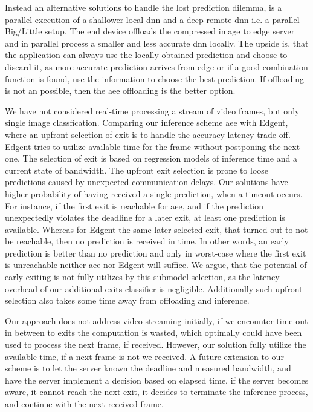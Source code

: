 Instead an alternative solutions to handle the lost prediction dilemma, is a parallel execution of a shallower local \gls{dnn} and a deep remote \gls{dnn} i.e. a parallel Big/Little setup. The end device offloads the compressed image to edge server and in parallel process a smaller and less accurate \gls{dnn} locally. The upside is, that the application can always use the locally obtained prediction and choose to discard it, as more accurate prediction arrives from edge or if a good combination function is found, use the information to choose the best prediction. If offloading is not an possible, then the \gls{aee} offloading is the better option.

We have not considered real-time processing a stream of video frames, but only single image classfication. Comparing our inference scheme \gls{aee} with Edgent, where an upfront selection of exit is to handle the accuracy-latency trade-off. Edgent tries to utilize available time for the frame without postponing the next one. The selection of exit is based on regression models of inference time and a current state of bandwidth. The upfront exit selection is prone to loose predictions caused by unexpected communication delays. Our solutions have higher probability of having received a single prediction, when a timeout occurs. For instance, if the first exit is reachable for \gls{aee}, and if the prediction unexpectedly violates the deadline for a later exit, at least one prediction is available. Whereas for Edgent the same later selected exit, that turned out to not be reachable, then no prediction is received in time. In other words, an early prediction is better than no prediction and only in worst-case where the first exit is unreachable neither \gls{aee} nor Edgent will suffice. We argue, that the potential of early exiting is not fully utilizes by this submodel selection, as the latency overhead of our additional exits classifier is negligible. Additionally such upfront selection also takes some time away from offloading and inference.

Our approach does not address video streaming initially, if we encounter time-out in between to exits the computation is wasted, which optimally could have been used to process the next frame, if received. However, our solution fully utilize the available time, if a next frame is not we received. A future extension to our scheme is to let the server known the deadline and measured bandwidth, and have the server implement a decision based on elapsed time, if the server becomes aware, it cannot reach the next exit, it decides to terminate the inference process, and continue with the next received frame.

